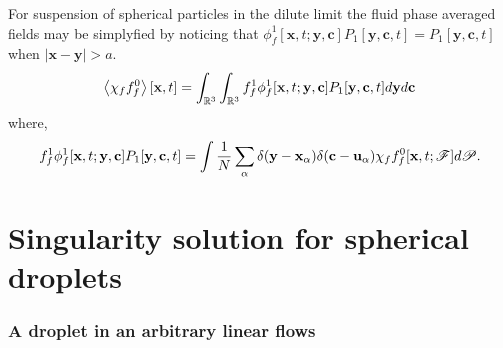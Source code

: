 For suspension of spherical particles in the dilute limit the fluid phase averaged fields may be simplyfied by noticing that $\phi_f^1[\textbf{x},t;\textbf{y},\textbf{c}] P_1[\textbf{y},\textbf{c},t] = P_1[\textbf{y},\textbf{c},t]$ when $|\textbf{x} - \textbf{y}| > a$. 
\begin{equation}
    \left<\chi_f f_f^0\right>[\textbf{x},t]
    = 
    \int_{\mathbb{R}^3}
    \int_{\mathbb{R}^3}
    f_f^1 \phi_f^1[\textbf{x},t;\textbf{y},\textbf{c}] P_1[\textbf{y},\textbf{c},t]
    d\textbf{y} 
    d\textbf{c}
\end{equation}
where,
\begin{equation*}
    f_f^1 \phi_f^1[\textbf{x},t;\textbf{y},\textbf{c}] P_1[\textbf{y},\textbf{c},t]
    =     
    \int
    \frac{1}{N}
    \sum_\alpha \delta(\textbf{y}-\textbf{x}_\alpha)
     \delta(\textbf{c}-\textbf{u}_\alpha)
    \chi_f
    f^0_f[\textbf{x},t;\mathscr{F}]
    d\mathscr{P}.
\end{equation*}

\section{Singularity solution for spherical droplets}

\subsubsection*{A droplet in an arbitrary linear flows}

